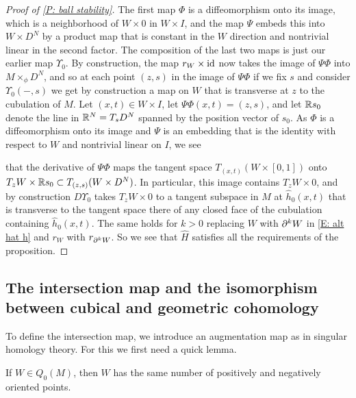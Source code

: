 \begin{proof}[Proof of \cref{P: ball stability}]
	The first map $\Phi$ is a diffeomorphism onto its image, which is a neighborhood of $W \times 0$ in $W \times I$, and the map $\Psi$ embeds this into $W \times D^N$ by a product map that is constant in the $W$ direction and nontrivial linear in the second factor.
	The composition of the last two maps is just our earlier map $\Upsilon_0$.
	By construction, the map $r_W \times \mathrm{id}$ now takes the image of $\Psi\Phi$ into $M\times_\phi D^N$, and so at each point $(z,s)$ in the image of $\Psi\Phi$ if we fix $s$ and consider $\Upsilon_0(-,s)$ we get by construction a map on $W$ that is transverse at $z$ to the cubulation of $M$.
	Let $(x,t) \in W \times I$, let $\Psi \Phi(x,t) = (z,s)$, and let $\mathbb{R} s_0$ denote the line in $\mathbb{R}^N = T_sD^N$ spanned by the position vector of $s_0$.
	As $\Phi$ is a diffeomorphism onto its image and $\Psi$ is an embedding that is the identity with respect to $W$ and nontrivial linear on $I$, we see
	\begin{comment}
	$\Psi\Phi$ takes a neighborhood of any $(x,t) \in W \times [0,1]$ to a neighborhood of its image in $W \times \R s_0$, where $\R s_0$ is the line in $\R^N$ spanned by $s_0$.
	\end{comment}
	that the derivative of $\Psi\Phi$ maps the tangent space $T_{(x,t)}(W \times [0,1])$ onto $ T_zW \times \mathbb{R} s_0 \subset T_{(z,s)}(W \times D^N)$.
	In particular, this image contains $T_zW \times 0$, and by construction $D\Upsilon_0$ takes $T_zW \times 0$ to a tangent subspace in $M$ at $\hat h_0(x,t)$ that is transverse to the tangent space there of any closed face of the cubulation containing $\hat h_0(x,t)$.
	The same holds for $k>0$ replacing $W$ with $\partial^{k}W$ in \eqref{E: alt hat h} and $r_W$ with $r_{\partial^{k}W}$.
	So we see that $\hat H$ satisfies all the requirements of the proposition.
\end{proof}

\subsection{The intersection map and the isomorphism between cubical and geometric cohomology}\label{S: intersection map}

To define the intersection map, we introduce an augmentation map as in singular homology theory.
For this we first need a quick lemma.

\begin{lemma}\label{L: Q0}
	If $W \in Q_0(M)$, then $W$ has the same number of positively and negatively oriented points.
\end{lemma}

